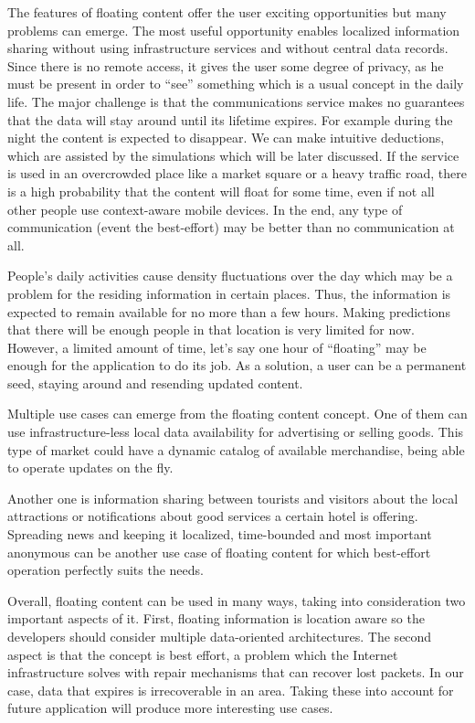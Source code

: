 The features of floating content offer the user exciting opportunities but
many problems can emerge. The most useful opportunity enables localized
information sharing without using infrastructure services and without central
data records. Since there is no remote access, it gives the user some degree of
privacy, as he must be present in order to ``see'' something which is a usual
concept in the daily life. The major challenge is that the communications
service makes no guarantees that the data will stay around until its lifetime
expires. For example  during the night the content is expected to disappear. We
can make intuitive deductions, which are assisted by the simulations which will
be later discussed. If the service is used in an overcrowded place like a market
square or a heavy traffic road, there is a high probability that the content
will float for some time, even if not all other people use context-aware mobile
devices. In the end, any type of communication (event the best-effort) may be
better than no communication at all.

People's daily activities cause density fluctuations over the day which may be a
problem for the residing information in certain places. Thus, the information is
expected to remain available for no more than a few hours. Making predictions
that there will be enough people in that location is very limited for now.
However, a limited amount of time, let's say one hour of ``floating'' may be
enough for the application to do its job. As a solution, a user can be a
permanent seed, staying around and resending updated content.

Multiple use cases can emerge from the floating content concept. One of them can
use infrastructure-less local data availability for advertising or selling
goods. This type of market could have a dynamic catalog of available
merchandise, being able to operate updates on the fly.

Another one is information sharing between tourists and visitors about the local
attractions or notifications about good services a certain hotel is offering.
Spreading news and keeping it localized, time-bounded and most important
anonymous can be another use case of floating content for which best-effort
operation perfectly suits the needs.

Overall, floating content can be used in many ways, taking into consideration
two important aspects of it. First, floating information is location aware
so the developers should consider multiple data-oriented architectures.
The second aspect is that the concept is best effort, a problem which
the Internet infrastructure solves with repair mechanisms that can recover lost
packets. In our case, data that expires is irrecoverable in an area. Taking
these into account for future application will produce more interesting use
cases.

